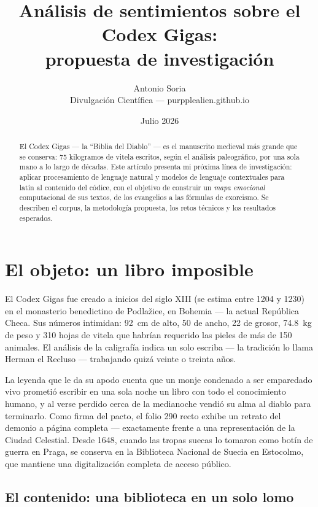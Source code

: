 \documentclass[11pt]{article}
\title{\textbf{Análisis de sentimientos sobre el Codex Gigas:\\propuesta de investigación}}
\author{Antonio Soria\\ \small{Divulgación Científica — purpplealien.github.io}}
\date{Julio 2026}
\begin{document}
\maketitle

\begin{abstract}
El Codex Gigas --- la ``Biblia del Diablo'' --- es el manuscrito medieval más grande que se
conserva: 75 kilogramos de vitela escritos, según el análisis paleográfico, por una sola mano
a lo largo de décadas. Este artículo presenta mi próxima línea de investigación: aplicar
procesamiento de lenguaje natural y modelos de lenguaje contextuales para latín al contenido
del códice, con el objetivo de construir un \emph{mapa emocional} computacional de sus textos,
de los evangelios a las fórmulas de exorcismo. Se describen el corpus, la metodología
propuesta, los retos técnicos y los resultados esperados.
\end{abstract}

\section{El objeto: un libro imposible}

El Codex Gigas fue creado a inicios del siglo XIII (se estima entre 1204 y 1230) en el
monasterio benedictino de Podlažice, en Bohemia --- la actual República Checa. Sus números
intimidan: 92~cm de alto, 50 de ancho, 22 de grosor, 74.8~kg de peso y 310 hojas de vitela
que habrían requerido las pieles de más de 150 animales. El análisis de la caligrafía indica
un solo escriba --- la tradición lo llama Herman el Recluso --- trabajando quizá veinte o
treinta años.

La leyenda que le da su apodo cuenta que un monje condenado a ser emparedado vivo prometió
escribir en una sola noche un libro con todo el conocimiento humano, y al verse perdido cerca
de la medianoche vendió su alma al diablo para terminarlo. Como firma del pacto, el folio 290
recto exhibe un retrato del demonio a página completa --- exactamente frente a una
representación de la Ciudad Celestial. Desde 1648, cuando las tropas suecas lo tomaron como
botín de guerra en Praga, se conserva en la Biblioteca Nacional de Suecia en Estocolmo, que
mantiene una digitalización completa de acceso público.

\subsection{El contenido: una biblioteca en un solo lomo}
\end{document}
